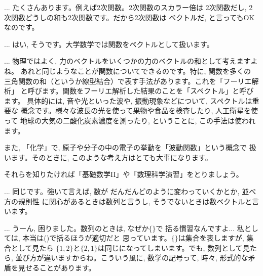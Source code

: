 \begin{faq}{\small{}
... たくさんあります。例えば2次関数。2次関数のスカラー倍は
2次関数だし, 2次関数どうしの和も2次関数です。だから2次関数は
ベクトルだ, と言ってもOKなのです。}
\end{faq}

\begin{faq}{\small{}
... はい, そうです。大学数学では関数をベクトルとして扱います。}\end{faq}

\begin{faq}{\small{}
... 物理ではよく, 力のベクトルをいくつかの力のベクトルの和として考えますよね。
あれと同じようなことが関数についてできるのです。特に, 関数を多くの
三角関数の和（というか線型結合）で表す手法があります。これを「フーリエ解析」
と呼びます。関数をフーリエ解析した結果のことを「スペクトル」と呼びます。
具体的には, 音や光といった波や, 振動現象などについて, スペクトルは重要な
概念です。様々な波長の光を使って果物や食品を検査したり, 人工衛星を使って
地球の大気の二酸化炭素濃度を測ったり, ということに, この手法は使われます。

また, 「化学」で, 原子や分子の中の電子の挙動を「波動関数」という概念で
扱います。そのときに, このような考え方はとても大事になります。

それらを知りたければ「基礎数学II」や「数理科学演習」をとりましょう。}\end{faq}

\begin{faq}{\small{}... 同じです。強いて言えば, 数が
だんだんどのように変わっていくかとか, 並べ方の規則性
に関心があるときは数列と言うし, そうでないときは数ベクトルと言います。}\end{faq}

\begin{faq}{\small{}
... うーん, 困りました。数列のときは, なぜか$\{\}$で
括る慣習なんですよ... 私としては, 本当は()で括るほうが適切だと
思っています。$\{\}$は集合を表しますが, 集合として見たら
$\{1, 2\}$と$\{2, 1\}$は同じになってしまいます。でも, 
数列として見たら, 並び方が違いますからね。こういう風に, 
数学の記号って, 時々, 形式的な矛盾を見せることがあります。}\end{faq}
\hv


